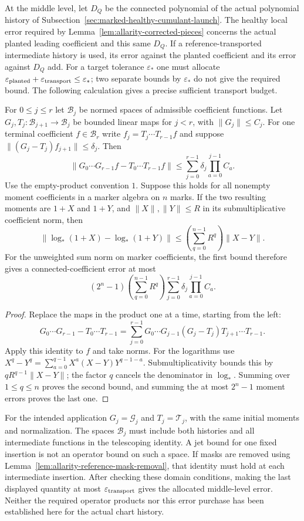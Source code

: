 At the middle level, let $D_Q$ be the connected polynomial of the
actual polynomial history of
Subsection~\ref{sec:marked-healthy-cumulant-launch}. The healthy local
error required by Lemma~\ref{lem:allarity-corrected-pieces} concerns
the actual planted leading coefficient and this same $D_Q$.
If a reference-transported intermediate history is used, its error
against the planted coefficient and its error against $D_Q$ add.
For a target tolerance $\varepsilon_*$ one must allocate
$\varepsilon_{\rm planted}+\varepsilon_{\rm transport}\le\varepsilon_*$;
two separate bounds by $\varepsilon_*$ do not give the required bound.
The following calculation gives a precise sufficient transport budget.

\begin{lemma}
\label{lem:allarity-two-route-budget}
For $0\le j\le r$ let $\mathcal B_j$ be normed spaces of admissible
coefficient functions. Let $G_j,T_j:\mathcal B_{j+1}\to\mathcal B_j$
be bounded linear maps for $j<r$, with $\|G_j\|\le C_j$.
For one terminal coefficient $f\in\mathcal B_r$ write
$f_j=T_j\cdots T_{r-1}f$ and suppose
$\|(G_j-T_j)f_{j+1}\|\le\delta_j$. Then
\[
 \|G_0\cdots G_{r-1}f-T_0\cdots T_{r-1}f\|
 \le\sum_{j=0}^{r-1}\delta_j\prod_{a=0}^{j-1}C_a.
\]
Use the empty-product convention $1$. Suppose this holds for all
nonempty moment coefficients in a marker algebra on $n$ marks.
If the two resulting moments are $1+X$ and $1+Y$, and
$\|X\|,\|Y\|\le R$ in its submultiplicative coefficient norm, then
\[
 \|\log_*(1+X)-\log_*(1+Y)\|
 \le \left(\sum_{q=0}^{n-1}R^q\right)\|X-Y\|.
\]
For the unweighted sum norm on marker coefficients, the first bound
therefore gives a connected-coefficient error at most
\[
 (2^n-1)\left(\sum_{q=0}^{n-1}R^q\right)
       \sum_{j=0}^{r-1}\delta_j\prod_{a=0}^{j-1}C_a.
\]
\end{lemma}
\begin{proof}
Replace the maps in the product one at a time, starting from the left:
\[
 G_0\cdots G_{r-1}-T_0\cdots T_{r-1}
 =\sum_{j=0}^{r-1}G_0\cdots G_{j-1}
             (G_j-T_j)T_{j+1}\cdots T_{r-1}.
\]
Apply this identity to $f$ and take norms. For the logarithms use
$X^q-Y^q=\sum_{a=0}^{q-1}X^a(X-Y)Y^{q-1-a}$.
Submultiplicativity bounds this by $qR^{q-1}\|X-Y\|$; the factor $q$
cancels the denominator in $\log_*$. Summing over $1\le q\le n$
proves the second bound, and summing the at most $2^n-1$ moment errors
proves the last one.
\end{proof}

For the intended application $G_j=\mathcal G_j$ and $T_j=\mathcal T_j$,
with the same initial moments and normalization. The spaces
$\mathcal B_j$ must include both histories and all intermediate
functions in the telescoping identity. A jet bound for one fixed
insertion is not an operator bound on such a space. If masks are
removed using Lemma~\ref{lem:allarity-reference-mask-removal}, that
identity must hold at each intermediate insertion. After checking
these domain conditions, making the last displayed quantity at most
$\varepsilon_{\rm transport}$ gives the allocated middle-level error.
Neither the required operator products nor this error purchase has
been established here for the actual chart history.


